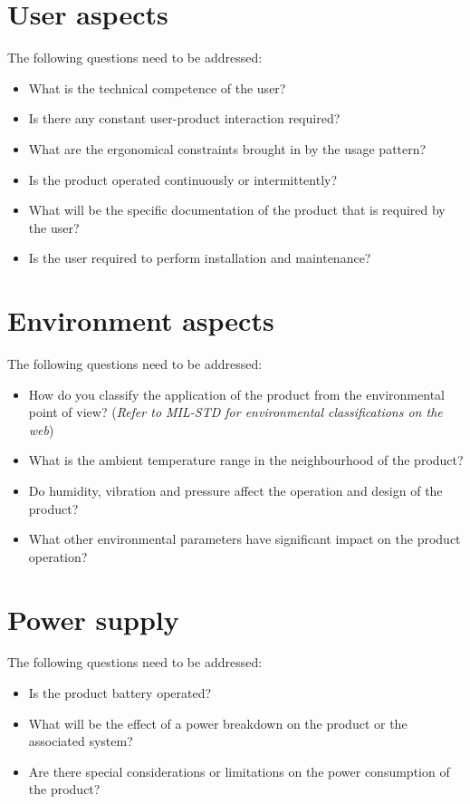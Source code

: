 \section{User aspects}

The following questions need to be addressed:
\begin{itemize}
\item What is the technical competence of the user?
\item Is there any constant user-product interaction required?
\item What are the ergonomical constraints brought in by the usage pattern?
\item Is the product operated continuously or intermittently?
\item What will be the specific documentation of the product that is required
by the user?
\item Is the user required to perform installation and maintenance?
\end{itemize}

\section{Environment aspects}

The following questions need to be addressed:
\begin{itemize}
\item How do you classify the application of the product from the environmental
point of view? (\emph{Refer to MIL-STD for environmental classifications
on the web})
\item What is the ambient temperature range in the neighbourhood of the
product?
\item Do humidity, vibration and pressure affect the operation and design
of the product?
\item What other environmental parameters have significant impact on the
product operation?
\end{itemize}

\section{Power supply}

The following questions need to be addressed:
\begin{itemize}
\item Is the product battery operated?
\item What will be the effect of a power breakdown on the product or the
associated system?
\item Are there special considerations or limitations on the power consumption
of the product?
\end{itemize}

